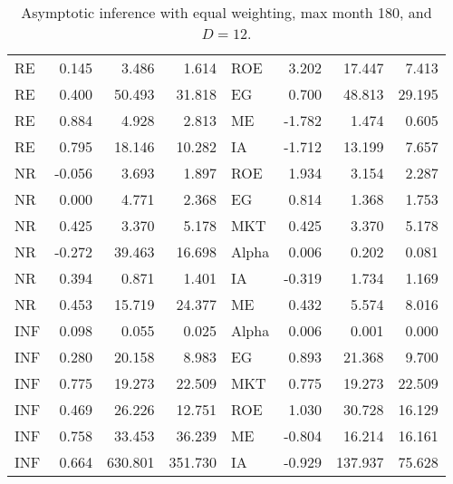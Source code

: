 \begin{table}[ht]
{\begin{tabular}{lrrrlrrr}
			RE & 0.145 & 3.486 & 1.614 & ROE & 3.202 & 17.447 & 7.413 \\ 
			RE & 0.400 & 50.493 & 31.818 & EG & 0.700 & 48.813 & 29.195 \\ 
			RE & 0.884 & 4.928 & 2.813 & ME & -1.782 & 1.474 & 0.605 \\ 
			RE & 0.795 & 18.146 & 10.282 & IA & -1.712 & 13.199 & 7.657 \\ 
			\hline
			NR & -0.056 & 3.693 & 1.897 & ROE & 1.934 & 3.154 & 2.287 \\ 
			NR & 0.000 & 4.771 & 2.368 & EG & 0.814 & 1.368 & 1.753 \\ 
			NR & 0.425 & 3.370 & 5.178 & MKT & 0.425 & 3.370 & 5.178 \\ 
			NR & -0.272 & 39.463 & 16.698 & Alpha & 0.006 & 0.202 & 0.081 \\ 
			NR & 0.394 & 0.871 & 1.401 & IA & -0.319 & 1.734 & 1.169 \\ 
			NR & 0.453 & 15.719 & 24.377 & ME & 0.432 & 5.574 & 8.016 \\ 
			\hline
			INF & 0.098 & 0.055 & 0.025 & Alpha & 0.006 & 0.001 & 0.000 \\ 
			INF & 0.280 & 20.158 & 8.983 & EG & 0.893 & 21.368 & 9.700 \\ 
			INF & 0.775 & 19.273 & 22.509 & MKT & 0.775 & 19.273 & 22.509 \\ 
			INF & 0.469 & 26.226 & 12.751 & ROE & 1.030 & 30.728 & 16.129 \\ 
			INF & 0.758 & 33.453 & 36.239 & ME & -0.804 & 16.214 & 16.161 \\ 
			INF & 0.664 & 630.801 & 351.730 & IA & -0.929 & 137.937 & 75.628 \\ 
			\hline
			\hline
		\end{tabular}
	}
	\caption{Asymptotic inference with equal weighting, max month 180, and $D=12$.} 
	\label{tab:ai_180_EW_VYP_SL}
\end{table}


